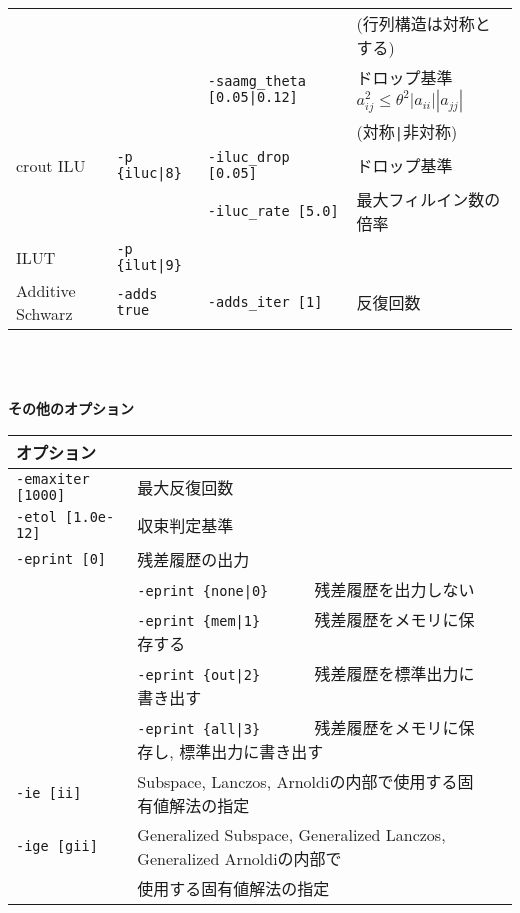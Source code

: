 \documentclass[a4paper]{jarticle}
\begin{document}
{{\begin{minipage}[t]{\textwidth}
\begin{center}
\begin{tabular}{l|lll}
         &                       &                                 & (行列構造は対称とする) \\
         &                       & \verb=-saamg_theta [0.05|0.12]= & ドロップ基準 $a^2_{ij}\le\theta^2|a_{ii}||a_{jj}|$ \\
         &                       &                             & (対称\verb=|=非対称) \\
crout ILU& \verb=-p {iluc|8}=    & \verb=-iluc_drop [0.05]=    & ドロップ基準    \\
         &                       & \verb=-iluc_rate [5.0]=     & 最大フィルイン数の倍率 \\
ILUT     & \verb=-p {ilut|9}=    &     \\
Additive Schwarz  & \verb=-adds true=   &  \verb=-adds_iter [1]= & 反復回数   \\
\hline         
\end{tabular}
\end{center}
\end{minipage}
\\ \\
\begin{minipage}[t]{\textwidth}
\begin{center}
{\bf その他のオプション}\\
\begin{tabular}{l|ll}\hline\hline
オプション &                          \\ \hline
\verb=-emaxiter [1000]= & 最大反復回数         \\ 
\verb=-etol [1.0e-12]=  & 収束判定基準              \\
\verb=-eprint [0]=      & 残差履歴の出力                 \\
                       & \verb=-eprint {none|0}     =  残差履歴を出力しない \\
                       & \verb=-eprint {mem|1}      =  残差履歴をメモリに保存する\\
                       & \verb=-eprint {out|2}      =  残差履歴を標準出力に書き出す\\
                       & \verb=-eprint {all|3}      =  残差履歴をメモリに保存し, 標準出力に書き出す\\
\verb=-ie [ii]= & Subspace, Lanczos, Arnoldiの内部で使用する固有値解法の指定  \\
\verb=-ige [gii]= & Generalized Subspace, Generalized Lanczos, Generalized Arnoldiの内部で\\
                       & 使用する固有値解法の指定  \\

\end{tabular}
\end{center}
\end{minipage}}}
\end{document}
